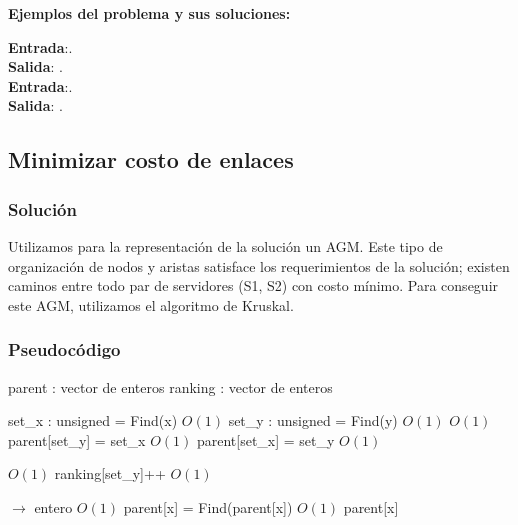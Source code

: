 \documentclass[a4paper, 10pt, twoside]{article}
\newenvironment{pseudo}[1][]{%
    \vspace{0.5em}%
    \begin{algorithmic}%
}
{%
    \end{algorithmic}%
    \vspace{0.5em}%
}
\newcommand{\Ode}[1]{\hfill $O(#1)$}
\begin{document}
\textbf{Ejemplos del problema y sus soluciones:}

\textbf{Entrada}:. \\
\textbf{Salida}: . \\

\textbf{Entrada}:. \\
\textbf{Salida}: . \\

\subsection{Minimizar costo de enlaces}
\subsubsection{Solución}
Utilizamos para la representación de la solución un AGM. Este tipo de organización de nodos y aristas satisface los requerimientos de la solución; existen caminos entre todo par de servidores (S1, S2) con costo mínimo. Para conseguir este AGM, utilizamos el algoritmo de Kruskal.

\subsubsection{Pseudocódigo}

\begin{pseudo}

\State parent : vector de enteros
\State ranking : vector de enteros

    \State set\_x : unsigned = Find(x)                    \Ode{1}
    \State set\_y : unsigned = Find(y)                    \Ode{1}
                    \Ode{1}
    \State parent[set\_y] = set\_x                    \Ode{1}
    \Else
        \State parent[set\_x] = set\_y                    \Ode{1}
    \EndIf
    
                     \Ode{1}
        \State ranking[set\_y]++                      \Ode{1}
    \EndIf
\EndProcedure



 $\rightarrow$ entero
                               \Ode{1}
        \State parent[x] = Find(parent[x])                  \Ode{1}
    \EndIf
    \Return parent[x]
\EndProcedure

\end{pseudo}
\end{document}
